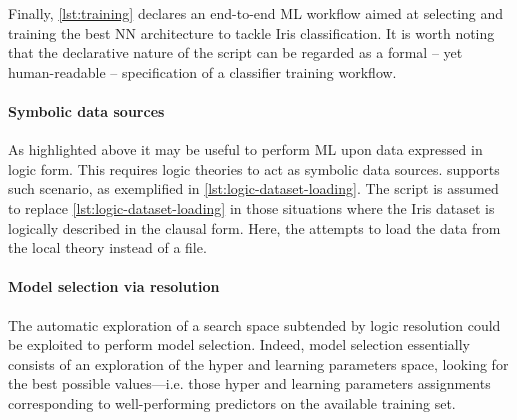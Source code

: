 \documentclass[runningheads]{llncs}
\begin{document}
Finally, \cref{lst:training} declares an end-to-end ML workflow aimed at selecting and training the best NN architecture to tackle Iris classification.
%
It is worth noting that the declarative nature of the script can be regarded as a formal -- yet human-readable -- specification of a classifier training workflow.

\paragraph{Symbolic data sources}

As highlighted above it may be useful to perform ML upon data expressed in logic form.
%
This requires logic theories to act as symbolic data sources.
%
\mllib{} supports such scenario, as exemplified in \cref{lst:logic-dataset-loading}.
%
The script is assumed to replace \cref{lst:logic-dataset-loading} in those situations where the Iris dataset is logically described in the clausal form.
%
Here, the  attempts to load the data from the local theory instead of a file.


\paragraph{Model selection via resolution}
\label{par:model-selection}

The automatic exploration of a search space subtended by logic resolution could be exploited to perform model selection.
%
Indeed, model selection essentially consists of an exploration of the hyper and learning parameters space, looking for the best possible values---i.e. those hyper and learning parameters assignments corresponding to well-performing predictors on the available training set.
\end{document}
